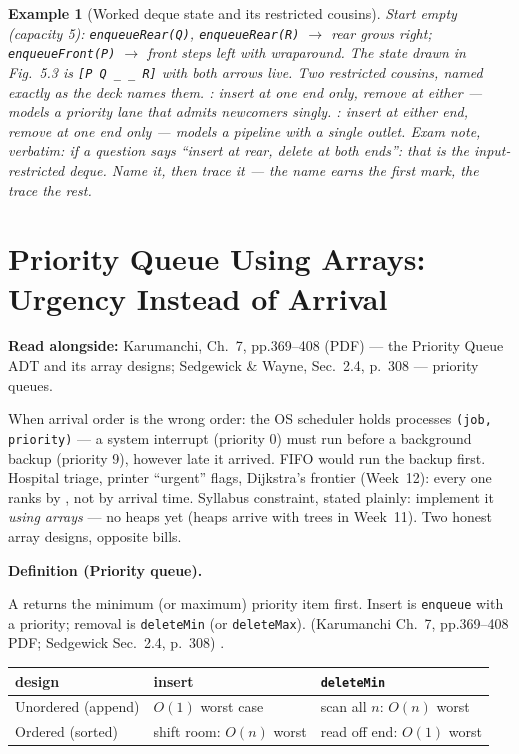 \documentclass[11pt]{article}
\newtheorem{example}{Example}[section]
\newenvironment{definitionbox}[1]{%
  \par\noindent\textbf{Definition (#1).}\ \itshape
}{\par\vspace{0.3em}}
\begin{document}
\begin{example}[Worked deque state and its restricted cousins]
Start empty (capacity 5): \texttt{enqueueRear(Q)}, \texttt{enqueueRear(R)} $\to$ rear grows right; \texttt{enqueueFront(P)} $\to$ front steps left with wraparound. The state drawn in Fig.~5.3 is \texttt{[P Q \_ \_ R]} with both arrows live. Two restricted cousins, named exactly as the deck names them. : insert at one end only, remove at either --- models a priority lane that admits newcomers singly. : insert at either end, remove at one end only --- models a pipeline with a single outlet. Exam note, verbatim: if a question says ``insert at rear, delete at both ends'': that is the input-restricted deque. Name it, then trace it --- the name earns the first mark, the trace the rest.
\end{example}

\section{Priority Queue Using Arrays: Urgency Instead of Arrival}

\textbf{Read alongside:} Karumanchi, Ch.~7, pp.369--408 (PDF) --- the Priority Queue ADT and its array designs; Sedgewick \& Wayne, Sec.~2.4, p.~308 --- priority queues.

When arrival order is the wrong order: the OS scheduler holds processes \texttt{(job, priority)} --- a system interrupt (priority 0) must run before a background backup (priority 9), however late it arrived. FIFO would run the backup first. Hospital triage, printer ``urgent'' flags, Dijkstra's frontier (Week~12): every one ranks by , not by arrival time. Syllabus constraint, stated plainly: implement it \emph{using arrays} --- no heaps yet (heaps arrive with trees in Week~11). Two honest array designs, opposite bills.

\begin{definitionbox}{Priority queue}
A  returns the minimum (or maximum) priority item first. Insert is \texttt{enqueue} with a priority; removal is \texttt{deleteMin} (or \texttt{deleteMax}). (Karumanchi Ch.~7, pp.369--408 PDF; Sedgewick Sec.~2.4, p.~308) \cite{Karumanchi2017_data_structures_algorithms_made_easy,Sedgewick2011_algorithms}.
\end{definitionbox}

\begin{center}
{\footnotesize
\begin{tabular}{lll}
  \toprule
  \textbf{design} & \textbf{insert} & \textbf{\texttt{deleteMin}} \\
  \midrule
  Unordered (append) & $O(1)$ worst case & scan all $n$: $O(n)$ worst \\
  Ordered (sorted) & shift room: $O(n)$ worst & read off end: $O(1)$ worst \\
  \bottomrule
\end{tabular}}
\end{center}
\end{document}
